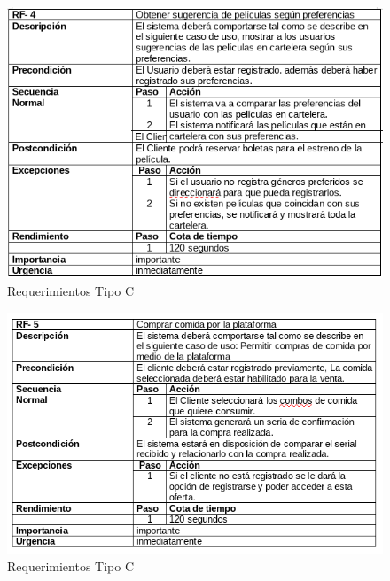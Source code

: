 \newpage
\begin{figure}[h!]
\centering
\includegraphics[width=.8\linewidth]{diseno/requerimientos/imgs/casos4}
	\caption{Requerimientos Tipo C}
\end{figure}
\newpage
\begin{figure}[h!]
\centering
\includegraphics[width=.8\linewidth]{diseno/requerimientos/imgs/casos5}
	\caption{Requerimientos Tipo C}
\end{figure}


